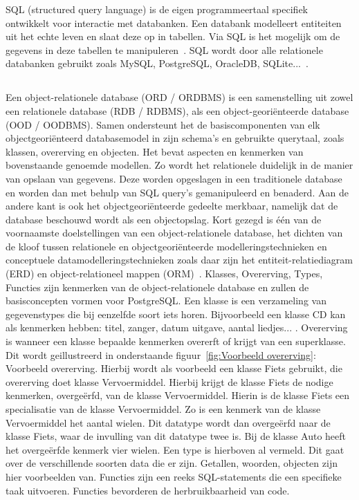 SQL (structured query language) is de eigen programmeertaal specifiek ontwikkelt voor interactie met databanken. Een databank modelleert entiteiten uit het echte leven en slaat deze op in tabellen. Via SQL is het mogelijk om de gegevens in deze tabellen te manipuleren~\autocite{Carchedi2020}. SQL wordt door alle relationele databanken gebruikt zoals MySQL, PostgreSQL, OracleDB, SQLite...~\autocite{Codecademy}. 

\subsection{}
\label{subsec:Object-relationele databank}

Een object-relationele database (ORD / ORDBMS) is een samenstelling uit zowel een relationele database (RDB / RDBMS), als een object-georiënteerde database (OOD / OODBMS). Samen ondersteunt het de basiscomponenten van elk objectgeoriënteerd databasemodel in zijn schema's en gebruikte querytaal, zoals klassen, overerving en objecten. Het bevat aspecten en kenmerken van bovenstaande genoemde modellen. Zo wordt het relationele duidelijk in de manier van opslaan van gegevens. Deze worden opgeslagen in een traditionele database en worden dan met behulp van SQL query's gemanipuleerd en benaderd. Aan de andere kant is ook het objectgeoriënteerde gedeelte merkbaar, namelijk dat de database beschouwd wordt als een objectopslag. Kort gezegd is één van de voornaamste doelstellingen van een object-relationele database, het dichten van de kloof tussen relationele en objectgeoriënteerde modelleringstechnieken en conceptuele datamodelleringstechnieken zoals daar zijn het entiteit-relatiediagram (ERD) en object-relationeel mappen (ORM)~\autocite{Technopedia2021}. %
Klasses, Overerving, Types, Functies zijn kenmerken van de object-relationele database en zullen de basisconcepten vormen voor PostgreSQL. Een klasse is een verzameling van gegevenstypes die bij eenzelfde soort iets horen. Bijvoorbeeld een klasse CD kan als kenmerken hebben: titel, zanger, datum uitgave, aantal liedjes... . 
Overerving is wanneer een klasse bepaalde kenmerken overerft of krijgt van een superklasse. Dit wordt geillustreerd in onderstaande figuur~\ref{fig:Voorbeeld overerving}: Voorbeeld overerving. Hierbij wordt als voorbeeld een klasse Fiets gebruikt, die overerving doet klasse Vervoermiddel. Hierbij krijgt de klasse Fiets de nodige kenmerken, overgeërfd, van de klasse Vervoermiddel. Hierin is de klasse Fiets een specialisatie van de klasse Vervoermiddel. Zo is een kenmerk van de klasse Vervoermiddel het aantal wielen. Dit datatype wordt dan overgeërfd naar de klasse Fiets, waar de invulling van dit datatype twee is. Bij de klasse Auto heeft het overgeërfde kenmerk vier wielen. Een type is hierboven al vermeld. Dit gaat over de verschillende soorten data die er zijn. Getallen, woorden, objecten zijn hier voorbeelden van. Functies zijn een reeks SQL-statements die een specifieke taak uitvoeren. Functies bevorderen de herbruikbaarheid van code.


